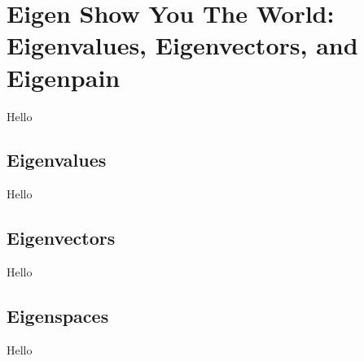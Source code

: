 \chapter{Eigen Show You The World: Eigenvalues, Eigenvectors, and Eigenpain}
Hello %

\section{Eigenvalues}
Hello

\section{Eigenvectors}
Hello

\section{Eigenspaces}
Hello
